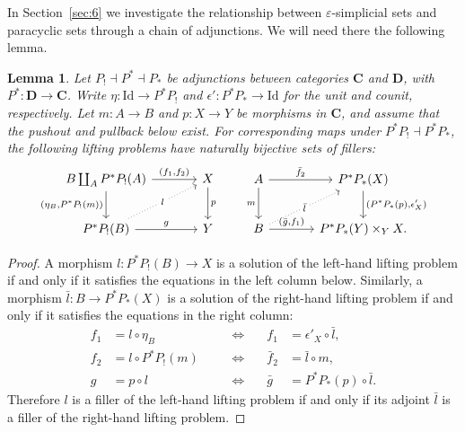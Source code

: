 \documentclass{article}
\theoremstyle{plain}
\newtheorem{lemma}[theorem]{Lemma}
\theoremstyle{definition}
\theoremstyle{remark}
\begin{document}
In Section~\ref{sec:6} we investigate the relationship between $\varepsilon$-simplicial sets and paracyclic sets through a chain of adjunctions.
We will need there the following lemma.
\begin{lemma}\label{lem:eqLifProb}
Let $P_!\dashv P^*\dashv P_*$ be adjunctions between
categories $\mathbf C$ and $\mathbf D$, with
$P^*\colon\mathbf D\to\mathbf C$.
Write $\eta\colon\mathrm{Id}\to P^*P_!$ and
$\epsilon'\colon P^*P_*\to\mathrm{Id}$ for the unit
and counit, respectively.
Let $m\colon A\to B$ and $p\colon X\to Y$ be morphisms
in $\mathbf C$, and assume that the pushout and pullback
below exist.
For corresponding maps under $P^*P_!\dashv P^*P_*$,
the following lifting problems have naturally bijective
sets of fillers:
\begin{equation}\label{diag:eqLifProb}
\begin{tikzcd}[column sep=3.6em, row sep=2.2em]
B\coprod_A P^*P_!(A)
\arrow[r,"{(f_1,f_2)}"]
\arrow[d,"{(\eta_B,P^*P_!(m))}"']
&
X
\arrow[d,"p"]
\\
P^*P_!(B)
\arrow[ru,"l"' description,dotted]
\arrow[r,"g"]
&
Y
\end{tikzcd}
\qquad
\begin{tikzcd}[column sep=3.6em, row sep=2.2em]
A
\arrow[r,"\bar f_2"]
\arrow[d,"m"']
&
P^*P_*(X)
\arrow[d,"{(P^*P_*(p),\epsilon'_X)}"]
\\
B
\arrow[ru,"\bar l"' description,dotted]
\arrow[r,"{(\bar g,f_1)}"]
&
P^*P_*(Y)\times_Y X .
\end{tikzcd}
\end{equation}
\end{lemma}
\begin{proof}
A morphism \(l\colon P^*P_!(B)\to X\) is a solution of the left-hand lifting problem if and only if it satisfies the equations in the left column below. Similarly, a morphism \(\bar l\colon B\to P^*P_*(X)\) is a solution of the right-hand lifting problem if and only if it satisfies the equations in the right column:
\[
\begin{alignedat}{3}
f_1 &= l\circ\eta_B
&\quad&\Longleftrightarrow\quad&
f_1 &= \epsilon'_X\circ\bar l,\\
f_2 &= l\circ P^*P_!(m)
&\quad&\Longleftrightarrow\quad&
\bar f_2 &= \bar l \circ m,\\
g &= p\circ l
&\quad&\Longleftrightarrow\quad&
\bar g &= P^*P_*(p)\circ\bar l .
\end{alignedat}
\]
Therefore \(l\) is a filler of the left-hand lifting problem if and only if its adjoint \(\bar l\) is a filler of the right-hand lifting problem.
\end{proof}
\end{document}

